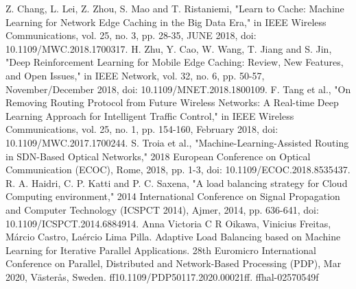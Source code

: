 \documentclass[conference]{IEEEtran}
\begin{document}
%
%
%
\begin{thebibliography}{1}

Z. Chang, L. Lei, Z. Zhou, S. Mao and T. Ristaniemi, "Learn to Cache: Machine Learning for Network Edge Caching in the Big Data Era," in IEEE Wireless Communications, vol. 25, no. 3, pp. 28-35, JUNE 2018, doi: 10.1109/MWC.2018.1700317.
H. Zhu, Y. Cao, W. Wang, T. Jiang and S. Jin, "Deep Reinforcement Learning for Mobile Edge Caching: Review, New Features, and Open Issues," in IEEE Network, vol. 32, no. 6, pp. 50-57, November/December 2018, doi: 10.1109/MNET.2018.1800109.
F. Tang et al., "On Removing Routing Protocol from Future Wireless Networks: A Real-time Deep Learning Approach for Intelligent Traffic Control," in IEEE Wireless Communications, vol. 25, no. 1, pp. 154-160, February 2018, doi: 10.1109/MWC.2017.1700244.
S. Troia et al., "Machine-Learning-Assisted Routing in SDN-Based Optical Networks," 2018 European Conference on Optical Communication (ECOC), Rome, 2018, pp. 1-3, doi: 10.1109/ECOC.2018.8535437.
R. A. Haidri, C. P. Katti and P. C. Saxena, "A load balancing strategy for Cloud Computing environment," 2014 International Conference on Signal Propagation and Computer Technology (ICSPCT 2014), Ajmer, 2014, pp. 636-641, doi: 10.1109/ICSPCT.2014.6884914.
Anna Victoria C R Oikawa, Vinicius Freitas, Márcio Castro, Laércio Lima Pilla. Adaptive Load
Balancing based on Machine Learning for Iterative Parallel Applications. 28th Euromicro International Conference on Parallel, Distributed and Network-Based Processing (PDP), Mar 2020, Västerås,
Sweden. ff10.1109/PDP50117.2020.00021ff. ffhal-02570549f

\end{thebibliography}
\end{document}
